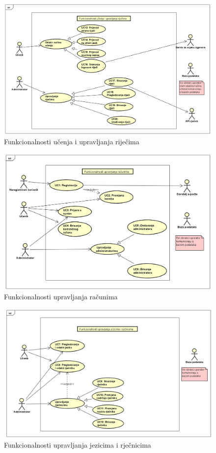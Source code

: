 \begin{figure}[H]
	\includegraphics[scale=0.6]{dijagrami/upravljanje_rijecima.png} 
	\centering
	\caption{Funkcionalnosti učenja i upravljanja riječima}
	\label{fig:dijagram1}
\end{figure}

\begin{figure}[H]
	\includegraphics[scale=0.6]{dijagrami/upravljanje_Racunima.png} 
	\centering
	\caption{Funkcionalnosti upravljanja računima}
	\label{fig:dijagram2}
\end{figure}

\begin{figure}[H]
	\includegraphics[scale=0.6]{dijagrami/upravljanje_rjecnicima.png} 
	\centering
	\caption{Funkcionalnosti upravljanja jezicima i rječnicima}
	\label{fig:dijagram3}
\end{figure}	

